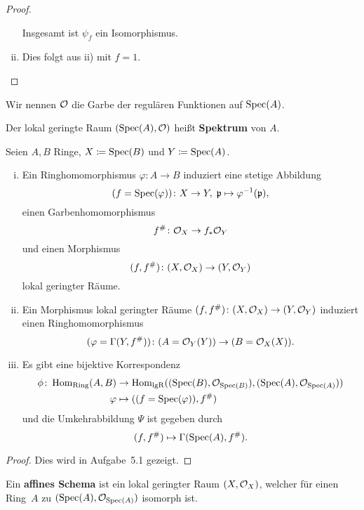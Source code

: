 \begin{prop}
\begin{proof}
\begin{enumerate}[i)]
			Insgesamt ist $\psi_f$ ein Isomorphismus.
			\item Dies folgt aus ii) mit $f=1$.
		\end{enumerate}
	\end{proof}
\end{prop}

\begin{bem*}
	Wir nennen $\mathcal{O}$ die Garbe der regulären Funktionen auf $\operatorname{Spec}(A)$.
\end{bem*}

\begin{defn}
	Der lokal geringte Raum $(\operatorname{Spec}(A), \mathcal{O})$ heißt \textbf{Spektrum} von $A$.
\end{defn}

\pagebreak[2]
\begin{prop}
\label{prop:4.14}
	Seien $A, B$ Ringe, $X \coloneqq \operatorname{Spec}(B)$ und $Y \coloneqq \operatorname{Spec}(A)$.
	\begin{enumerate}[i)]
		\item Ein Ringhomomorphismus $\varphi\colon A \to B$ induziert eine stetige Abbildung
		\[
			(f = \operatorname{Spec}(\varphi))\colon X \to Y,\; \mathfrak{p} \mapsto \varphi^{-1}(\mathfrak{p}),
		\]
		einen Garbenhomomorphismus
		\[
			f^{\#}\colon \mathcal{O}_X \to f_*\mathcal{O}_Y
		\]
		und einen Morphismus
		\[
			(f,f^{\#})\colon (X,\mathcal{O}_X)\to (Y,\mathcal{O}_Y)
		\]
		lokal geringter Räume.
		\item Ein Morphismus lokal geringter Räume $(f,f^{\#})\colon (X,\mathcal{O}_X)\to(Y,\mathcal{O}_Y)$ induziert einen Ringhomomorphismus
		\[
			(\varphi = \Gamma(Y,f^{\#}))\colon (A = \mathcal{O}_Y(Y)) \to (B=\mathcal{O}_X(X)).
		\]
		\item Es gibt eine bijektive Korrespondenz
		\begin{align*}
			\phi\colon \operatorname{Hom}_{\operatorname{Ring}}(A,B) &\to \operatorname{Hom}_{\operatorname{lgR}}((\operatorname{Spec}(B),\mathcal{O}_{\operatorname{Spec}(B)}),(\operatorname{Spec}(A),\mathcal{O}_{\operatorname{Spec}(A)}))\\
			\varphi & \mapsto ((f=\operatorname{Spec}(\varphi)),f^{\#})
		\end{align*}
		und die Umkehrabbildung $\Psi$ ist gegeben durch
		\[
			(f,f^{\#})\mapsto \Gamma(\operatorname{Spec}(A),f^{\#}).
		\]
	\end{enumerate}
	\begin{proof}
		Dies wird in Aufgabe~5.1 gezeigt.
	\end{proof}
\end{prop}

\begin{defn}
	Ein \textbf{affines Schema} ist ein lokal geringter Raum $(X,\mathcal{O}_X)$, welcher für einen Ring~$A$ zu $(\operatorname{Spec}(A),\mathcal{O}_{\operatorname{Spec}(A)})$ isomorph ist.
\end{defn}

